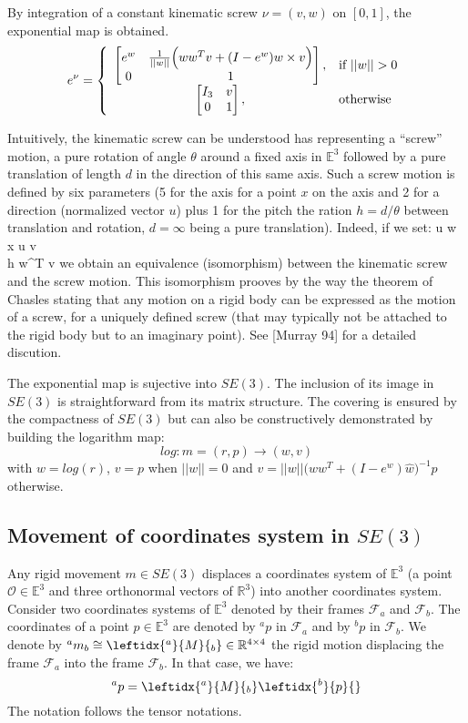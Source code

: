 \documentclass{book}
\begin{document}
By integration of a constant kinematic screw $\nu = (v,w)$ on $[0,1]$, the exponential map is obtained.
\[ e^{\nu} =
\left\{ \begin{array}{cl}
 \BIN e^{w} &  \frac{1}{||w||}\Big( ww^Tv + (I-e^{w}) w \times v \Big) \\ 0 & 1 \BOUT,& \textrm{if } ||w||>0 \\
 \BIN I_3 &  v \\ 0 & 1 \BOUT,& \textrm{otherwise}
\end{array}\right.
\] 

Intuitively, the kinematic screw can be understood has representing a ``screw'' motion, \mie a pure rotation of angle $\theta$ around a fixed axis in $\mathbb{E}^3$ followed by a pure translation of length $d$ in the direction of this same axis. Such a screw motion is defined by six parameters (5 for the axis  for a point $x$ on the axis and 2 for a  direction (normalized vector $u$) plus 1 for the pitch \mie the ration $h=d/\theta$ between translation and rotation, $d=\infty$ being a pure translation). Indeed, if we set:
\EAIN u \triangleq {} w  \\ x \triangleq u \times v \\ h \triangleq w^T v \EAOUT
we obtain an equivalence (isomorphism) between the kinematic screw and the screw motion. This isomorphism prooves by the way the theorem of Chasles stating that any motion on a rigid body can be expressed as the motion of a screw, for a uniquely defined screw (that may typically not be attached to the rigid body but to an imaginary point).
See [Murray 94] for a detailed discution.

The exponential map is sujective into $SE(3)$. The inclusion of its image in $SE(3)$ is straightforward from its matrix structure. The covering is ensured by the compactness of $SE(3)$ but can also be constructively demonstrated by building the logarithm map:
\[ log: m = (r,p) \rightarrow (w, v) \]
with $w=log(r)$, $v = p$ when $||w||=0$ and $v = ||w|| \Big( ww^T + (I-e^w)\hat{w} \Big)^{-1} p$ otherwise.

\subsection{Movement of coordinates system in $SE(3)$}

Any rigid movement $m \in SE(3)$ displaces a coordinates system of $\mathbb{E}^3$ (\mie a point $\mathcal{O} \in \mathbb{E}^3$ and three orthonormal vectors of $\mathbb{R}^3$) into another coordinates system. Consider two coordinates systems of $\mathbb{E}^3$ denoted by their frames $\mathcal{F}_a$ and  $\mathcal{F}_b$. The coordinates of a point $p\in \mathbb{E}^3$ are denoted by $^ap$ in $\mathcal{F}_a$ and by $^bp$ in $\mathcal{F}_b$. We denote by $^am_b \repr \leftidx{^a}{M}{_b} \in \mathbb{R}^{4\times4}$ the rigid motion displacing the frame $\mathcal{F}_a$ into the frame  $\mathcal{F}_b$. In that case, we have:
\[ ^ap = \leftidx{^a}{M}{_b} \leftidx{^b}{p}{} \]
The notation follows the tensor notations. 
\end{document}
